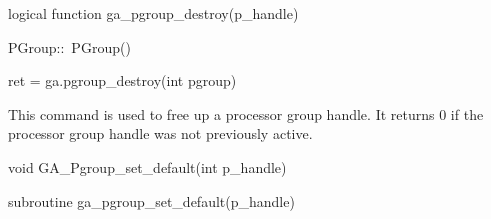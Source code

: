 \documentclass[10pt]{article}
\begin{document}
\begin{fapi}
\begin{fcode}
logical function ga_pgroup_destroy(p_handle)
\end{fcode}
\begin{funcargs}
\end{funcargs}
\end{fapi}

\begin{cxxapi}
\begin{cxxcode}
PGroup::~PGroup()
\end{cxxcode}
\end{cxxapi}

\begin{pyapi}
\begin{pycode}
ret = ga.pgroup_destroy(int pgroup)
\end{pycode}
\begin{funcargs}
\end{funcargs}
\end{pyapi}

\gcoll

\begin{desc}

This command is used to free up a processor group handle. It returns 0 if the
processor group handle was not previously active.

\end{desc}


\begin{capi}
\begin{ccode}
void GA_Pgroup_set_default(int p_handle)
\end{ccode}
\begin{funcargs}
\end{funcargs}
\end{capi}

\begin{fapi}
\begin{fcode}
subroutine ga_pgroup_set_default(p_handle)
\end{fcode}
\begin{funcargs}
\end{funcargs}
\end{fapi}
\end{document}

